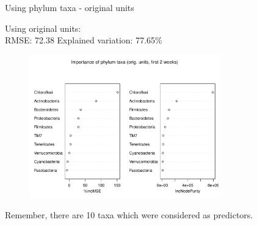 \documentclass{beamer}
\begin{document}
\begin{frame}{Using phylum taxa - original units}

  {\scriptsize
    
  \noindent Using original units:\\
  RMSE: 72.38  \hspace{0.05in}  Explained variation: 77.65\%

  \begin{center}
    \begin{figure}
      \includegraphics[width=3.25in]{../only_phyla/first_two_weeks/orig_units_first_two_weeks_phyla_imp_plot}
    \end{figure}
  \end{center}
  \vspace{-0.25in}

\noindent Remember, there are 10 taxa which were considered as predictors.
}

\end{frame}
\end{document}
